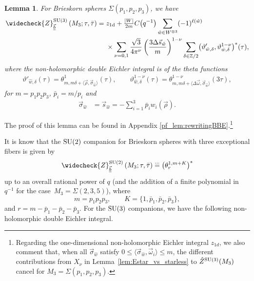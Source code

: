 \documentclass[10pt,a4paper]{amsart}
\def\BZ{\mathbb{Z}}
\newcommand{\Zchlong}[3]{\ensuremath{\widecheck{Z}^{#1}_{#2}\left(#3;\tau,\bar{\tau}\right)}}
\def\bv{{\vec{\underline{b}}}}
\newtheorem{lem}[thm]{Lemma}
\theoremstyle{definition}
\numberwithin{equation}{section}
\begin{document}
\begin{lem}\label{lem:brieskorn_thetas}
 For Brieskorn spheres $\Sigma(p_1,p_2,p_3)$, we have
\begin{align*}%
\Zchlong{{\rm SU}(3)}{\bv}{M_3}
 ={}&z_{1\rm d}+ \tfrac{|W|}{2m}C\bigl(q^{-1}\bigr) \sum\limits_{\hat{w}\in W^{\otimes 3}}(-1)^{\ell(\hat{w})} \\
 &\times\sum_{\nu=0,1} \frac{\sqrt{3}}{4 \pi^{\nu}}	\left(\frac {3\Delta\vec{s}_{\hat w}}{m}\right)^{1-\nu}\sum_{\delta\in\BZ/2} \bigl(\vartheta'_{\hat w,\delta},\vartheta^{1-\nu}_{\hat w,\delta}\bigr)^\ast(\tau)
,
\end{align*}
where the non-holomorphic double Eichler integral is of the theta functions
\begin{gather*}
 \vartheta'_{\hat w,\delta}(\tau)=
 \theta^1_{m, m\delta+\langle \vec\rho, \vec\sigma_{\hat w}\rangle}(\tau),\qquad
 \vartheta^{1-\nu}_{\hat w,\delta}(\tau) = \theta^{1-\nu}_{m,m\delta + \langle \Delta\vec\omega, \vec{\sigma}_{\hat w}\rangle}(3\tau),
 \end{gather*}
for $m=p_1p_2p_3$, $\bar p_i = m/p_i$ and
\begin{align*}
\vec\sigma_{\hat w} &= \vec{s}_{\hat{w}} = -\sum\limits_{i=1}^3 \bar{p}_i w_i(\vec{\rho}) .
\end{align*}
\end{lem}
The proof of this lemma can be found in Appendix \ref{pf_lem:rewritingBBE}.\footnote{Regarding the one-dimensional non-holomorphic Eichler integral $z_{1d}$,
we also comment that, when all $\vec\sigma_{\hat w}$ satisfy $0\leq \langle \vec\sigma_{\hat w}, \vec \omega_i\rangle \leq m$, the different contributions from $X_\nu$
in Lemma~\ref{lem:Estar_vs_starless}
to $\hat Z^{{\rm SU}(3)}(M_3)$ cancel for $M_3=\Sigma(p_1,p_2,p_3)$.}

It is know that the ${\rm SU}(2)$ companion for Brieskorn spheres with three exceptional fibers is given by~\cite{cheng20193d}
\begin{equation*}
 \Zchlong{{\rm SU}(2)}{\bv}{M_{3}}\stackrel{\dots}{=}\bigl(\theta^{1,m+K}_r\bigr)^\ast
\end{equation*}
up to an overall rational power of $q$ (and the addition of a finite polynomial in $q^{-1}$ for the case~$M_3=\Sigma(2,3,5)$), where
\begin{equation}\label{brieskorn_K}
 m=p_1p_2p_3,\qquad K=\{1,\bar p_1,\bar p_2,\bar p_3\},
\end{equation}
and $r=m-\bar p_1-\bar p_2-\bar p_3$. For the ${\rm SU}(3)$ companions, we have the following non-holomorphic double Eichler integral.
\end{document}
